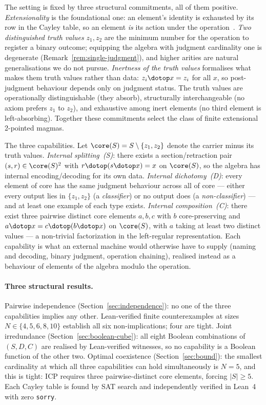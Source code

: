 The setting is fixed by three structural commitments, all of them positive.
\emph{Extensionality} is the foundational one: an element's identity is
exhausted by its row in the Cayley table, so an element \emph{is} its
action under the operation~\cite{burris81}. \emph{Two distinguished
truth values} $z_1, z_2$ are the minimum number for the operation to
register a binary outcome; equipping the algebra with judgment cardinality
one is degenerate (Remark~\ref{rem:single-judgment}), and higher arities
are natural generalisations we do not pursue. \emph{Inertness of the
truth values} formalises what makes them truth values rather than data:
$z_i \dotop x = z_i$ for all $x$, so post-judgment behaviour depends only
on judgment status. The truth values are operationally distinguishable
(they absorb), structurally interchangeable (no axiom prefers $z_1$ to
$z_2$), and exhaustive among inert elements (no third element is
left-absorbing). Together these commitments select the class of finite
extensional 2-pointed magmas.

The three capabilities. Let $\core(S) = S \setminus \{z_1, z_2\}$ denote
the carrier minus its truth values. \emph{Internal splitting~(S)}: there
exists a section/retraction pair $(s, r) \in \core(S)^2$ with
$r \dotop (s \dotop x) = x$ on $\core(S)$, so the algebra has internal
encoding/decoding for its own data. \emph{Internal dichotomy~(D)}: every
element of core has the same judgment behaviour across all of core ---
either every output lies in $\{z_1, z_2\}$ (a \emph{classifier}) or no
output does (a \emph{non-classifier}) --- and at least one example of each
type exists. \emph{Internal composition~(C)}: there exist three pairwise
distinct core elements $a, b, c$ with $b$ core-preserving and
$a \dotop x = c \dotop (b \dotop x)$ on $\core(S)$, with $a$ taking at
least two distinct values --- a non-trivial factorization in the
left-regular representation. Each capability is what an external machine
would otherwise have to supply (naming and decoding, binary judgment,
operation chaining), realised instead as a behaviour of elements of the
algebra modulo the operation.

\paragraph{Three structural results.} Pairwise independence (Section~\ref{sec:independence}):
no one of the three capabilities implies any other. Lean-verified finite
counterexamples at sizes $N \in \{4, 5, 6, 8, 10\}$ establish all six
non-implications; four are tight. Joint irredundance
(Section~\ref{sec:boolean-cube}): all eight Boolean combinations of
$(S, D, C)$ are realised by Lean-verified witnesses, so no capability is
a Boolean function of the other two. Optimal coexistence
(Section~\ref{sec:bound}): the smallest cardinality at which all three
capabilities can hold simultaneously is $N = 5$, and this is tight: ICP
requires three pairwise-distinct core elements, forcing $|S| \geq 5$.
Each Cayley table is found by SAT search and independently verified in
Lean~4~\cite{moura21} with zero \texttt{sorry}.

